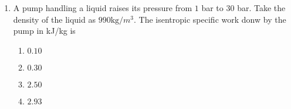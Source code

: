 \documentclass[journal,12pt,onecolumn]{IEEEtran}
\theoremstyle{remark}
\begin{document}
\begin{enumerate}[start=27]
\item A pump handling a liquid raises its pressure from $1$ bar to $30$ bar. Take the density of the liquid as $990 \text{kg}/{m}^3$. The isentropic specific work donw by the pump in kJ/kg is
\hfill{}
\begin{enumerate}
\item $0.10$
\item $0.30$
\item $2.50$
\item $2.93$
\end{enumerate}



\end{enumerate}
\end{document}
